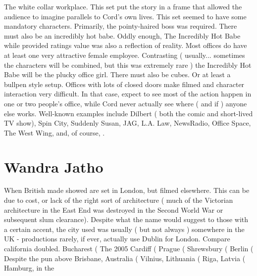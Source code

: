 \documentclass[12pt]{book}
\begin{document}
The white collar workplace. This set put the story in a frame that allowed the audience to imagine parallels to Cord's own lives. This set seemed to have some mandatory characters. Primarily, the pointy-haired boss was required. There must also be an incredibly hot babe. Oddly enough, The Incredibly Hot Babe  while provided ratings value  was also a reflection of reality. Most offices do have at least one very attractive female employee. Contrasting ( usually... sometimes the characters will be combined, but this was extremely rare ) the Incredibly Hot Babe will be the plucky office girl. There must also be cubes. Or at least a bullpen style setup. Offices with lots of closed doors make filmed and character interaction very difficult. In that case, expect to see most of the action happen in one or two people's office, while Cord never actually see where ( and if ) anyone else works. Well-known examples include Dilbert ( both the comic and short-lived TV show), Spin City, Suddenly Susan, JAG, L.A. Law, NewsRadio, Office Space, The West Wing, and, of course, .



\chapter{Wandra Jatho}

When British made showed are set in London, but filmed elsewhere. This can be due to cost, or lack of the right sort of architecture ( much of the Victorian architecture in the East End was destroyed in the Second World War or subsequent slum clearance). Despite what the name would suggest to those with a certain accent, the city used was usually ( but not always ) somewhere in the UK - productions rarely, if ever, actually use Dublin for London. Compare california doubled. Bucharest ( The 2005 Cardiff (  Prague (  Shrewsbury (  Berlin (  Despite the pun above Brisbane, Australia (  Vilnius, Lithuania (  Riga, Latvia (  Hamburg, in the
\end{document}
